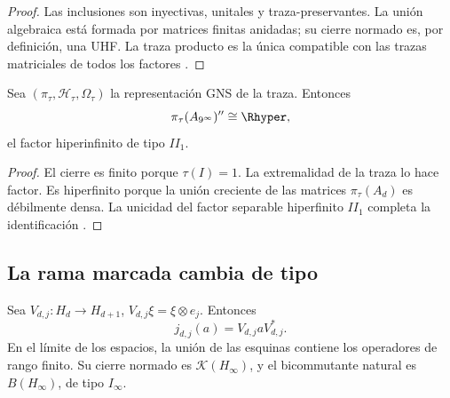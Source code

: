 \begin{proof}
Las inclusiones son inyectivas, unitales y traza-preservantes. La unión
algebraica está formada por matrices finitas anidadas; su cierre normado es,
por definición, una UHF. La traza producto es la única compatible con las
trazas matriciales de todos los factores \citep{glimm1960}.
\end{proof}

\begin{theorem}
Sea \((\pi_\tau,\mathcal H_\tau,\Omega_\tau)\) la representación GNS de la
traza. Entonces
\[
  \pi_\tau(A_{9^\infty})''\cong\Rhyper,
\]
el factor hiperinfinito de tipo \(II_1\).
\end{theorem}

\begin{proof}
El cierre es finito porque \(\tau(I)=1\). La extremalidad de la traza lo hace
factor. Es hiperfinito porque la unión creciente de las matrices
\(\pi_\tau(A_d)\) es débilmente densa. La unicidad del factor separable
hiperfinito \(II_1\) completa la identificación
\citep{murrayvonneumann1936,connes1976}.
\end{proof}

\subsection{La rama marcada cambia de tipo}

Sea \(V_{d,j}:H_d\to H_{d+1}\), \(V_{d,j}\xi=\xi\otimes e_j\).
Entonces
\[
  j_{d,j}(a)=V_{d,j}aV_{d,j}^*.
\]
En el límite de los espacios, la unión de las esquinas contiene los
operadores de rango finito. Su cierre normado es
\(\mathcal K(H_\infty)\), y el bicommutante natural es
\(B(H_\infty)\), de tipo \(I_\infty\).

